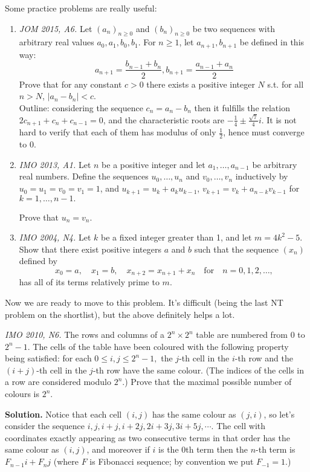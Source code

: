\documentclass[11pt,a4paper]{article}
\begin{document}
Some practice problems are really useful:
\begin{enumerate}
\item \emph{JOM 2015, A6.} Let $(a_{n})_{n\ge 0}$ and $(b_{n})_{n\ge 0}$ be two sequences with arbitrary real values $a_0, a_1, b_0, b_1$. For $n\ge 1$, let $a_{n+1}, b_{n+1}$ be defined in this way:
$$a_{n+1}=\dfrac{b_{n-1}+b_{n}}{2}, b_{n+1}=\dfrac{a_{n-1}+a_{n}}{2}$$
Prove that for any constant $c>0$ there exists a positive integer $N$ s.t. for all $n>N$, $|a_{n}-b_{n}|<c$.\\
Outline: considering the sequence $c_n=a_n-b_n$ then it fulfills the relation $2c_{n+1}+c_n+c_{n-1}=0$, and the characteristic roots are $-\frac14\pm\frac{\sqrt{7}}{4}i$. It is not hard to verify that each of them has modulus of only $\frac 12$, hence must converge to 0.

\item\emph {IMO 2013, A1.} Let $n$ be a positive integer and let $a_1, \ldots, a_{n-1} $ be arbitrary real numbers. Define the sequences $u_0, \ldots, u_n $ and $v_0, \ldots, v_n $ inductively by $u_0 = u_1 = v_0 = v_1 = 1$, and $u_{k+1} = u_k + a_k u_{k-1}$, $v_{k+1} = v_k + a_{n-k} v_{k-1}$ for $k=1, \ldots, n-1.$

Prove that $u_n = v_n.$

\item\emph{IMO 2004, N4.} Let $k$ be a fixed integer greater than 1, and let ${m=4k^2-5}$. Show that there exist positive integers $a$ and $b$ such that the sequence $(x_n)$ defined by \[x_0=a,\quad x_1=b,\quad x_{n+2}=x_{n+1}+x_n\quad\text{for}\quad n=0,1,2,\dots,\] has all of its terms relatively prime to $m$.

\end{enumerate}

Now we are ready to move to this problem. It's difficult (being the last NT problem on the shortlist), but the above definitely helps a lot.

\emph {IMO 2010, N6.} The rows and columns of a $2^n \times 2^n$ table are numbered from $0$ to $2^{n}-1.$ The cells of the table have been coloured with the following property being satisfied: for each $0 \leq i,j \leq 2^n - 1,$ the $j$-th cell in the $i$-th row and the $(i+j)$-th cell in the $j$-th row have the same colour. (The indices of the cells in a row are considered modulo $2^n$.) Prove that the maximal possible number of colours is $2^n$.

\textbf {Solution.} Notice that each cell $(i,j)$ has the same colour as $(j,i)$, so let's consider the sequence $i,j,i+j,i+2j, 2i+3j, 3i+5j,\cdots $. The cell with coordinates exactly appearing as two consecutive terms in that order has the same colour as $(i,j)$, and moreover if $i$ is the 0th term then the $n$-th term is $F_{n-1}i+F_{n}j$ (where $F$ is Fibonacci sequence; by convention we put $F_{-1}=1$.)
\end{document}
